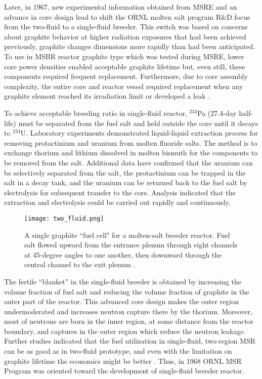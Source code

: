 Later, in 1967, new experimental information obtained from \gls{MSRE} and an advance in core design lead to shift the \gls{ORNL} molten salt program R\&D focus from the two-fluid to a single-fluid breeder. This switch was based on concerns about graphite behavior at higher radiation exposures that had been achieved previously, graphite changes dimensions more rapidly than had been anticipated. To use in \gls{MSBR} reactor graphite type which was tested during \gls{MSRE}, lower core power densities enabled acceptable graphite lifetime but, even still, these components required frequent replacement. Furthermore, due to core assembly complexity, the entire core and reactor vessel required replacement when any graphite element reached its irradiation limit or developed a leak \cite{rosenthal_molten-salt_1970}.

To achieve acceptable breeding ratio in single-fluid reactor, $^{233}$Pa (27.4-day half-life) must be separated from the fuel salt and held outside the core until it decays to $^{233}$U. Laboratory experiments demonstrated liquid-liquid extraction process for removing protactinium and uranium from molten fluoride salts. The method is to exchange thorium and lithium dissolved in molten bismuth for the components to be removed from the salt. Additional data have confirmed that the uranium can be selectively separated from the salt, the protactinium can be trapped in the salt in a decay tank, and the uranium can be returned back to the fuel salt by electrolysis for subsequent transfer to the core. Analysis indicated that the extraction and electrolysis could be carried out rapidly and continuously.

\begin{figure}[htp!] %
  \centering
  \vspace{-0.3em}
  \texttt{[image: two\_fluid.png]}
  \caption{A single graphite ``fuel cell" for a molten-salt breeder reactor. Fuel salt flowed upward from the entrance plenum through eight channels at 45-degree angles to one another, then downward through the central channel to the exit plenum \cite{briggs_molten-salt_1966}.}
  \vspace{-0.6em}
  \label{fig:two_fluid}
\end{figure}
\FloatBarrier

The fertile ``blanket'' in the single-fluid breeder is obtained by increasing the volume fraction of fuel salt and reducing the volume fraction of graphite in the outer part of the reactor. This advanced core design makes the outer region undermoderated and increases neutron capture there by the thorium. Moreover, most of neutrons are born in the inner region, at some distance from the reactor boundary, and captures in the outer region which reduce the neutron leakage. Further studies indicated that the fuel utilization in single-fluid, two-region \gls{MSR} can be as good as in two-fluid prototype, and even with the limitation on graphite lifetime the economics might be better \cite{rosenthal_molten-salt_1970}. Thus, in 1968 \gls{ORNL} \gls{MSR} Program was oriented toward the development of single-fluid breeder reactor.

